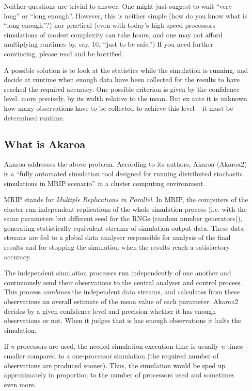 Neither questions are trivial to answer. One might just suggest
to wait ``very long'' or ``long enough''. However, this is neither
simple (how do you know what is ``long enough''?) nor practical
(even with today's high speed processors simulations of modest complexity
can take hours, and one may not afford multiplying runtimes by,
say, 10, ``just to be safe.'') If you need further convincing,
please read \cite{Pawlikowsky02} and be horrified.

A possible solution is to look at the statistics while the simulation
is running, and decide at runtime when enough data have been
collected for the results to have reached the required accuracy.
One possible criterion is given by the confidence level,
more precisely, by its width relative to the mean.
But ex ante it is unknown how many observations have to be collected
to achieve this level -- it must be determined runtime.


\subsection{What is Akaroa}

Akaroa \cite{Akaroa99} addresses the above problem.
According to its authors, Akaroa (Akaroa2) is a ``fully automated
simulation tool designed for running distributed stochastic simulations
in MRIP scenario'' in a cluster computing environment.

MRIP stands for \textit{Multiple Replications in Parallel}.
In MRIP, the computers of the cluster run independent replications
of the whole simulation process (i.e. with the same parameters but
different seed for the RNGs (random number generators)),
generating statistically equivalent streams of simulation output data.
These data streams are fed to a global data analyser responsible for
analysis of the final results and for stopping the simulation
when the results reach a satisfactory accuracy.

The independent simulation processes run independently of one another
and continuously send their observations to the central analyser
and control process. This process \textit{combines} the independent data streams,
and calculates from these observations an overall estimate of the mean value
of each parameter.
Akaroa2 decides by a given confidence level and precision
whether it has enough observations or not. When it judges that is
has enough observations it halts the simulation.

If \textit{n} processors are used, the needed simulation execution time
is usually \textit{n} times smaller compared to a one-processor
simulation (the required number of observations are produced sooner).
Thus, the simulation would be sped up approximately in proportion
to the number of processors used and sometimes even more.

